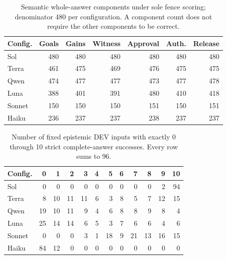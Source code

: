 \documentclass[a4paper,preprint,12pt,numbers,nopreprintline]{elsarticle}
\begin{document}
\begin{table}[htbp]\centering\scriptsize
\caption{Semantic whole-answer components under sole fence scoring; denominator 480 per configuration. A component count does not require the other components to be correct.}\label{tab:components-semantic-framing_sensitivity}
\setlength{\tabcolsep}{3pt}
\begin{tabular}{lrrrrrr}\toprule
Config. & Goals & Gains & Witness & Approval & Auth. & Release\\\midrule
Sol & 480 & 480 & 480 & 480 & 480 & 480\\
Terra & 461 & 475 & 469 & 476 & 475 & 475\\
Qwen & 474 & 477 & 477 & 473 & 477 & 478\\
Luna & 388 & 401 & 391 & 480 & 410 & 418\\
Sonnet & 150 & 150 & 150 & 151 & 150 & 151\\
Haiku & 236 & 237 & 237 & 238 & 237 & 237\\
\bottomrule\end{tabular}
\end{table}
\begin{table}[htbp]\centering\scriptsize
\caption{Number of fixed epistemic DEV inputs with exactly 0 through 10 strict complete-answer successes. Every row sums to 96.}\label{tab:consistency-epistemic}
\setlength{\tabcolsep}{3pt}
\begin{tabular}{lrrrrrrrrrrr}\toprule
Config. & 0 & 1 & 2 & 3 & 4 & 5 & 6 & 7 & 8 & 9 & 10\\\midrule
Sol & 0 & 0 & 0 & 0 & 0 & 0 & 0 & 0 & 0 & 2 & 94\\
Terra & 8 & 10 & 11 & 11 & 6 & 3 & 8 & 5 & 7 & 12 & 15\\
Qwen & 19 & 10 & 11 & 9 & 4 & 6 & 8 & 8 & 9 & 8 & 4\\
Luna & 25 & 14 & 14 & 6 & 5 & 3 & 7 & 6 & 6 & 4 & 6\\
Sonnet & 0 & 0 & 0 & 3 & 1 & 18 & 9 & 21 & 13 & 16 & 15\\
Haiku & 84 & 12 & 0 & 0 & 0 & 0 & 0 & 0 & 0 & 0 & 0\\
\bottomrule\end{tabular}
\end{table}
\end{document}

